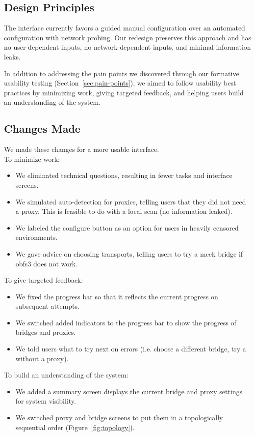 \documentclass[USenglish,oneside,twocolumn]{article}
\begin{document}
\subsection{Design Principles} 
The interface currently favors a guided manual configuration over an automated configuration with network probing. Our redesign preserves this approach and has no user-dependent inputs, no network-dependent inputs, and minimal information leaks.

In addition to addressing the pain points we discovered through our formative usability testing (Section~\ref{sec:pain-points}), we aimed to follow usability best practices by minimizing work, giving targeted feedback, and helping users build an understanding of the system.

\subsection{Changes Made} 
We made these changes for a more usable interface. \\

\noindent To minimize work: 
\begin{itemize}
\item We eliminated technical questions, resulting in fewer tasks and interface screens. 
\item We simulated auto-detection for proxies, telling users that they did not need a proxy. This is feasible to do with a local scan (no information leaked). 
\item We labeled the configure button as an option for users in heavily censored environments.
\item We gave advice on choosing transports, telling users to try a meek bridge if obfs3 does not work.
\end{itemize} 

To give targeted feedback: 
\begin{itemize}
\item We fixed the progress bar so that it reflects the current progress on subsequent attempts. 
\item We switched added indicators to the progress bar to show the progress of bridges and proxies. 
\item We told users what to try next on errors (i.e. choose a different bridge, try a without a proxy). 
\end{itemize}

To build an understanding of the system:
\begin{itemize}
\item We added a summary screen displays the current bridge and proxy settings for system visibility. 
\item We switched proxy and bridge screens to put them in a topologically sequential order (Figure~\ref{fig:topology}).
\end{itemize}
\end{document}
